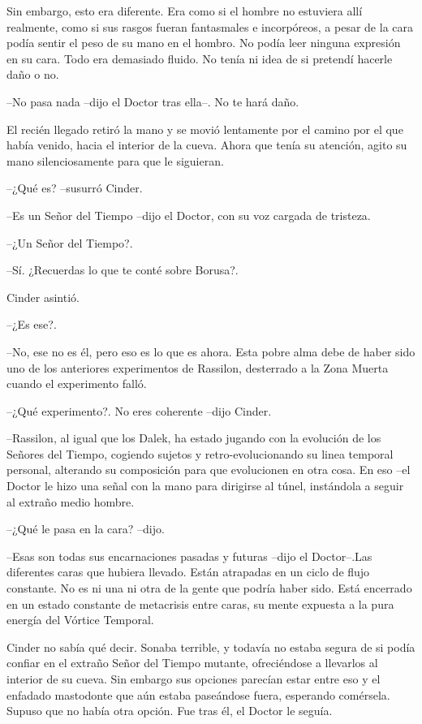 Sin embargo, esto era diferente. Era como si el hombre no estuviera allí realmente, como si sus rasgos fueran fantasmales e incorpóreos, a pesar de la cara podía sentir el peso de su mano en el hombro. No podía leer ninguna expresión en su cara. Todo era demasiado fluido. No tenía ni idea de si pretendí hacerle daño o no.



--No pasa nada --dijo el Doctor tras ella--. No te hará daño.



El recién llegado retiró la mano y se movió lentamente por el camino por el que había venido, hacia el interior de la cueva. Ahora que tenía su atención, agito su mano silenciosamente para que le siguieran.



--¿Qué es? --susurró Cinder.

--Es un Señor del Tiempo --dijo el Doctor, con su voz cargada de tristeza.

--¿Un Señor del Tiempo?.

--Sí. ¿Recuerdas lo que te conté sobre Borusa?.



Cinder asintió. 



--¿Es ese?.

--No, ese no es él, pero eso es lo que es ahora. Esta pobre alma debe de haber sido uno de los anteriores experimentos de Rassilon, desterrado a la Zona Muerta cuando el experimento falló.

--¿Qué experimento?. No eres coherente --dijo Cinder.

--Rassilon, al igual que los Dalek, ha estado jugando con la evolución de los Señores del Tiempo, cogiendo sujetos y retro-evolucionando su linea temporal personal, alterando su composición para que evolucionen en otra cosa. En eso --el Doctor le hizo una señal con la mano para dirigirse al túnel, instándola a seguir al extraño medio hombre.

--¿Qué le pasa en la cara? --dijo.

--Esas son todas sus encarnaciones pasadas y futuras --dijo el Doctor--.Las diferentes caras que hubiera llevado. Están atrapadas en un ciclo de flujo constante. No es ni una ni otra de la gente que podría haber sido. Está encerrado en un estado constante de metacrisis entre caras, su mente expuesta a la pura energía del Vórtice Temporal.



Cinder no sabía qué decir. Sonaba terrible, y todavía no estaba segura de si podía confiar en el extraño Señor del Tiempo mutante, ofreciéndose a llevarlos al interior de su cueva. Sin embargo sus opciones parecían estar entre eso y el enfadado mastodonte que aún estaba paseándose fuera, esperando comérsela. Supuso que no había otra opción. Fue tras él, el Doctor le seguía.


